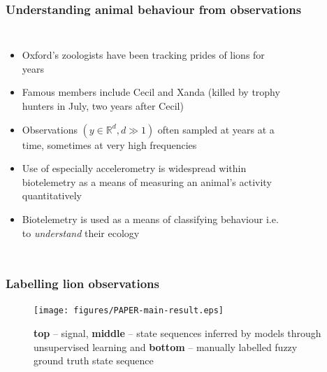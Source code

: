 \documentclass[aspectratio=169]{beamer}
\begin{document}

\begin{frame}[plain]
    \frametitle{Understanding animal behaviour from observations} 
    \begin{columns}[t] %


        \begin{itemize}
            \small
        \item Oxford's zoologists have been tracking prides of lions for years 
        \item Famous members include Cecil and Xanda (killed by trophy hunters in July, two years after Cecil)
        \item Observations $(y \in \mathbb{R}^d, d\gg1)$ often sampled at years at a time, sometimes at very high frequencies 
        \item Use of especially accelerometry is widespread within biotelemetry as a means of measuring an animal’s activity quantitatively
        \item Biotelemetry is used as a means of classifying behaviour i.e. to \emph{understand} their ecology
    \end{itemize}

    \vspace{-2em}
    \begin{figure}[ht]
        \\[-0em]
    \end{figure}
\end{columns}
    \end{frame}


    \begin{frame}
        \frametitle{Labelling lion observations}
        \begin{figure}[ht!]
            \texttt{[image: figures/PAPER-main-result.eps]}
            \vspace{-0.5em}
            \caption{{\bf top} --  signal, {\bf middle} -- state sequences inferred by models through unsupervised learning and {\bf bottom} -- manually labelled fuzzy ground truth state sequence}
        \end{figure}
    \end{frame}
\end{document}
